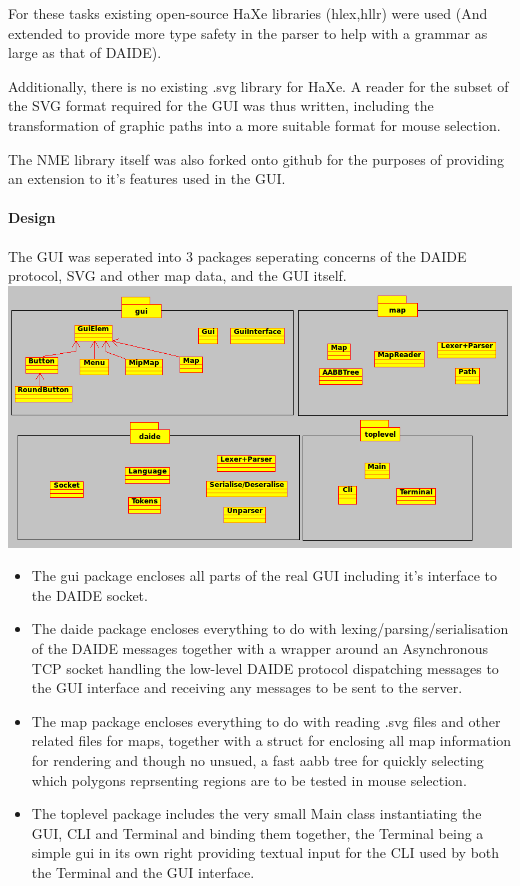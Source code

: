 \documentclass[pdftex,12pt,a4paper]{report}
\begin{document}
For these tasks existing open-source HaXe libraries (hlex,hllr) were used (And extended to provide more type safety in the parser to help with a grammar as large as that of DAIDE).

Additionally, there is no existing .svg library for HaXe. A reader for the subset of the SVG format required for the GUI was thus written, including the transformation of graphic paths into a more suitable format for mouse selection.

The NME library itself was also forked onto github for the purposes of providing an extension to it's features used in the GUI.

\paragraph{Design}
The GUI was seperated into 3 packages seperating concerns of the DAIDE protocol, SVG and other map data, and the GUI itself.\\[0.5cm]
\includegraphics[scale=0.5]{./gui/UML.png}\\[0.5cm]
\begin{itemize}
\item{The gui package encloses all parts of the real GUI including it's interface to the DAIDE socket.}
\item{The daide package encloses everything to do with lexing/parsing/serialisation of the DAIDE messages together with a wrapper around an Asynchronous TCP socket handling the low-level DAIDE protocol dispatching messages to the GUI interface and receiving any messages to be sent to the server.}
\item{The map package encloses everything to do with reading .svg files and other related files for maps, together with a struct for enclosing all map information for rendering and though no unsued, a fast aabb tree for quickly selecting which polygons reprsenting regions are to be tested in mouse selection.}
\item{The toplevel package includes the very small Main class instantiating the GUI, CLI and Terminal and binding them together, the Terminal being a simple gui in its own right providing textual input for the CLI used by both the Terminal and the GUI interface.}\\[1cm]
\end{itemize}
\end{document}
